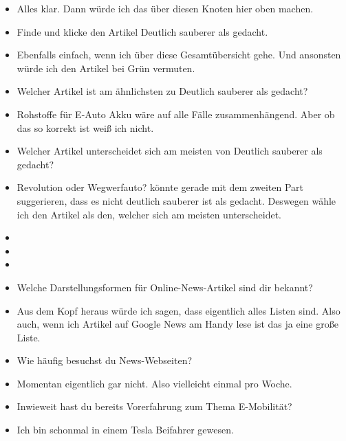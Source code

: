 {\begin{itemize}[]
                  Es wäre aber wichtig, wenn du einfach dein Vorgehen beschreibst wie du es gerade gemacht hast.
            \item {} Alles klar. Dann würde ich das über diesen Knoten hier oben machen.
            \item {} Finde und klicke den Artikel \flqq Deutlich sauberer als gedacht\frqq{}.
            \item {} Ebenfalls einfach, wenn ich über diese Gesamtübersicht gehe.
                  Und ansonsten würde ich den Artikel bei Grün vermuten.
            \item {} Welcher Artikel ist am ähnlichsten zu \flqq Deutlich sauberer als gedacht\frqq{}?
            \item {} \flqq Rohstoffe für E-Auto Akku\frqq{} wäre auf alle Fälle zusammenhängend.
                  Aber ob das so korrekt ist weiß ich nicht.
            \item {} Welcher Artikel unterscheidet sich am meisten von \flqq Deutlich sauberer als gedacht\frqq{}?
            \item {} \flqq Revolution oder Wegwerfauto?\frqq{} könnte gerade mit dem zweiten Part suggerieren, dass es nicht deutlich sauberer ist als gedacht.
                  Deswegen wähle ich den Artikel als den, welcher sich am meisten unterscheidet.
            \item {}
            \item {}
            \item {}
            \item {} Welche Darstellungsformen für Online-News-Artikel sind dir bekannt?
            \item {} Aus dem Kopf heraus würde ich sagen, dass eigentlich alles Listen sind.
                  Also auch, wenn ich Artikel auf Google News am Handy lese ist das ja eine große Liste.
            \item {} Wie häufig besuchst du News-Webseiten?
            \item {} Momentan eigentlich gar nicht. Also vielleicht einmal pro Woche.
            \item {} Inwieweit hast du bereits Vorerfahrung zum Thema E-Mobilität?
            \item {} Ich bin schonmal in einem Tesla Beifahrer gewesen.

\end{itemize}}
